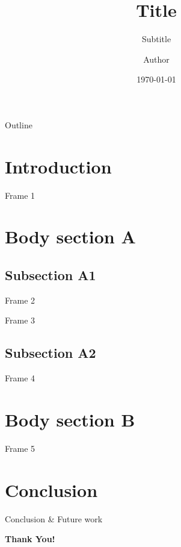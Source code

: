 \documentclass[compress,aspectratio=43]{beamer}
\title{Title}
\subtitle{Subtitle}
\author{Author}
\date{\today}
\institute{University of XXXX}
\begin{document}
\begin{frame}[plain]
    \titlepage
\end{frame}

\begin{frame}{Outline}
    \tableofcontents[sectionstyle=show,subsectionstyle=show/shaded/hide,
        subsubsectionstyle=show/shaded/hide]
\end{frame}

\section{Introduction}

\begin{frame}{Frame 1}

\end{frame}

\section{Body section A}

\subsection{Subsection A1}

\begin{frame}{Frame 2}

\end{frame}

\begin{frame}{Frame 3}

\end{frame}

\subsection{Subsection A2}

\begin{frame}{Frame 4}

\end{frame}

\section{Body section B}

\begin{frame}{Frame 5}

\end{frame}

\section{Conclusion}

\begin{frame}{Conclusion \& Future work}

\end{frame}

\begin{frame}[plain]
    \vspace{0.3\textheight}
    \Huge{\centerline{\color{simplebeamercolor}\textbf{Thank You!}}}
\end{frame}
\end{document}
